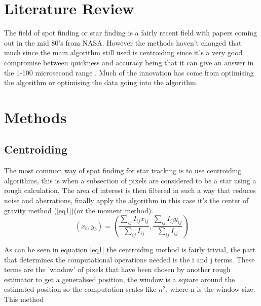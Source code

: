 \documentclass[aps,pra,a4paper,nofootinbib,onecolumn,tightenlines,longbibliography,12pt,amsfonts,amssymb,amsmath,floatfix]{revtex4-2} %
\begin{document}
  



\section{Literature Review} %
\label{sec:lit review}


The field of spot finding or star finding is a fairly recent field with papers
coming out in the mid 80's from NASA. However the methods haven't changed that
much since the main algorithm still used is centroiding since it's a very good
compromise between quickness and accuracy being that it can give an answer in
the 1-100 microsecond range \cite{delabie2014accurate}. Much of the innovation
has come from optimising the algorithm or optimising the data going into the
algorithm.


\section{Methods} %
\label{sec:Background}

  \subsection{Centroiding} %
  \label{sub:Centroiding_meth}
  
  
  
  The most common way of spot finding for star tracking is to use centroiding
  algorithms, this is when a subsection of pixels are considered to be a star
  using a rough calculation. The area of interest is then filtered in such a way
  that reduces noise and aberrations, finally apply the algorithm in this case
  it's the center of gravity method (\ref{eq1})(or the moment
  method)\cite{delabie2014accurate}\cite{stone1989comparison}.
  \begin{equation}\label{eq1}
      (x_b,y_b) = \left( {\frac{\sum_{ij} I_{ij}x_{ij}}{\sum_{ij} I_{ij}},\frac{\sum_{ij} I_{ij}y_{ij}}{\sum_{ij} I_{ij}}}\right)
  \end{equation}
  
  As can be seen in equation \ref{eq1} the centroiding method is fairly trivial, 
  the part that determines the computational operations needed is the i and j terms. 
  These terms are the 'window' of pixels that have been chosen by another rough estimator 
  to get a generalised position, the window is a square around the estimated position so 
  the computation scales like $n^2$, where n is the window size.
  This method \cite{stone1989comparison}
  
\end{document}
